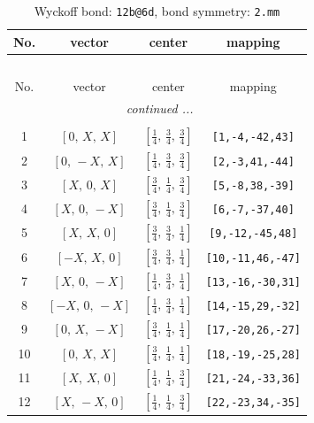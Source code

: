 \documentclass[fleqn,8pt]{jsarticle}
\begin{document}
\renewcommand{\arraystretch}{1.2}
\begin{longtable}{cccc}
\caption{Wyckoff bond: {\tt 12b@6d}, bond symmetry: {\tt 2.mm}}
 \\
 \hline \hline
No. & vector & center & mapping \\ \hline \endfirsthead

\multicolumn{3}{l}{\tablename\ \thetable{}} \\
 \hline \hline
No. & vector & center & mapping \\ \hline \endhead

 \hline \hline
\multicolumn{3}{r}{\footnotesize\it continued ...} \\ \endfoot

 \hline \hline
\multicolumn{3}{r}{} \\ \endlastfoot

1 & $\left[ 0,\, X,\, X \right]$ & $\left[ \frac{1}{4},\, \frac{3}{4},\, \frac{3}{4} \right]$ & {\tt [1,-4,-42,43]} \\ \hline
2 & $\left[ 0,\, - X,\, X \right]$ & $\left[ \frac{1}{4},\, \frac{3}{4},\, \frac{3}{4} \right]$ & {\tt [2,-3,41,-44]} \\ \hline
3 & $\left[ X,\, 0,\, X \right]$ & $\left[ \frac{3}{4},\, \frac{1}{4},\, \frac{3}{4} \right]$ & {\tt [5,-8,38,-39]} \\ \hline
4 & $\left[ X,\, 0,\, - X \right]$ & $\left[ \frac{3}{4},\, \frac{1}{4},\, \frac{3}{4} \right]$ & {\tt [6,-7,-37,40]} \\ \hline
5 & $\left[ X,\, X,\, 0 \right]$ & $\left[ \frac{3}{4},\, \frac{3}{4},\, \frac{1}{4} \right]$ & {\tt [9,-12,-45,48]} \\ \hline
6 & $\left[ - X,\, X,\, 0 \right]$ & $\left[ \frac{3}{4},\, \frac{3}{4},\, \frac{1}{4} \right]$ & {\tt [10,-11,46,-47]} \\ \hline
7 & $\left[ X,\, 0,\, - X \right]$ & $\left[ \frac{1}{4},\, \frac{3}{4},\, \frac{1}{4} \right]$ & {\tt [13,-16,-30,31]} \\ \hline
8 & $\left[ - X,\, 0,\, - X \right]$ & $\left[ \frac{1}{4},\, \frac{3}{4},\, \frac{1}{4} \right]$ & {\tt [14,-15,29,-32]} \\ \hline
9 & $\left[ 0,\, X,\, - X \right]$ & $\left[ \frac{3}{4},\, \frac{1}{4},\, \frac{1}{4} \right]$ & {\tt [17,-20,26,-27]} \\ \hline
10 & $\left[ 0,\, X,\, X \right]$ & $\left[ \frac{3}{4},\, \frac{1}{4},\, \frac{1}{4} \right]$ & {\tt [18,-19,-25,28]} \\ \hline
11 & $\left[ X,\, X,\, 0 \right]$ & $\left[ \frac{1}{4},\, \frac{1}{4},\, \frac{3}{4} \right]$ & {\tt [21,-24,-33,36]} \\ \hline
12 & $\left[ X,\, - X,\, 0 \right]$ & $\left[ \frac{1}{4},\, \frac{1}{4},\, \frac{3}{4} \right]$ & {\tt [22,-23,34,-35]} \\
\end{longtable}
\end{document}
